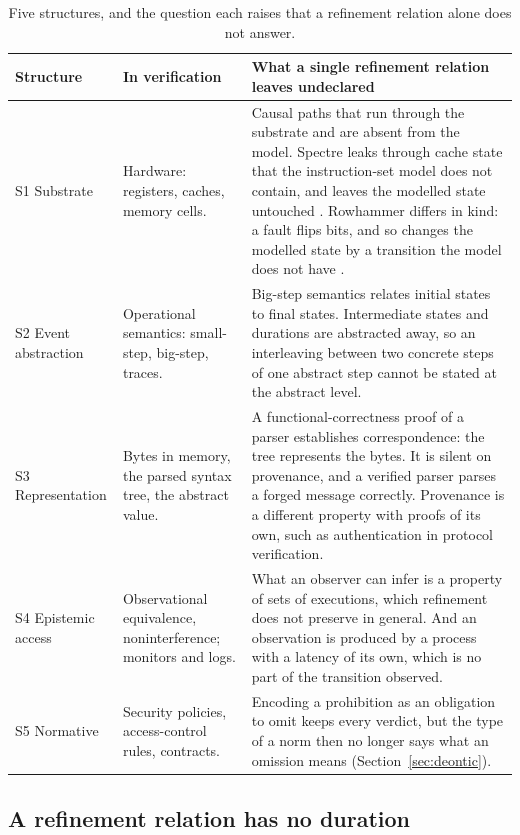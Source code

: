 \begin{table}[t]
\centering\small
\begin{tabularx}{\textwidth}{@{}P{2.1cm}P{3.3cm}L@{}}
\toprule
Structure & In verification & What a single refinement relation leaves undeclared \\
\midrule
S1 Substrate &
  Hardware: registers, caches, memory cells. &
  Causal paths that run through the substrate and are absent from the model. Spectre
  leaks through cache state that the instruction-set model does not contain, and leaves
  the modelled state untouched \citep{kocher2019}. Rowhammer differs in kind: a fault
  flips bits, and so changes the modelled state by a transition the model does not have
  \citep{kim2014}. \\
S2 Event abstraction &
  Operational semantics: small-step, big-step, traces. &
  Big-step semantics relates initial states to final states. Intermediate states and
  durations are abstracted away, so an interleaving between two concrete steps of one
  abstract step cannot be stated at the abstract level. \\
S3 Representation &
  Bytes in memory, the parsed syntax tree, the abstract value. &
  A functional-correctness proof of a parser establishes correspondence: the tree
  represents the bytes. It is silent on provenance, and a verified parser parses a
  forged message correctly. Provenance is a different property with proofs of its own,
  such as authentication in protocol verification. \\
S4 Epistemic access &
  Observational equivalence, noninterference; monitors and logs. &
  What an observer can infer is a property of sets of executions, which refinement does
  not preserve in general. And an observation is produced by a process with a latency of
  its own, which is no part of the transition observed. \\
S5 Normative &
  Security policies, access-control rules, contracts. &
  Encoding a prohibition as an obligation to omit keeps every verdict, but the type of a
  norm then no longer says what an omission means
  (Section~\ref{sec:deontic}). \\
\bottomrule
\end{tabularx}
\caption{Five structures, and the question each raises that a refinement relation alone
does not answer.}
\label{tab:five}
\end{table}

\subsection{A refinement relation has no duration}
\label{sec:duration}

